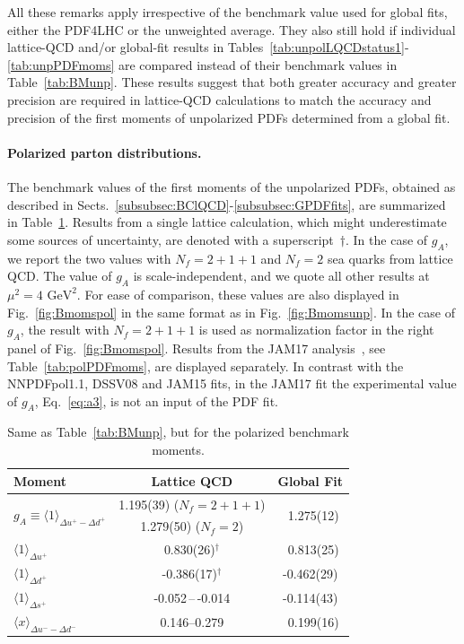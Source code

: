 All these remarks apply irrespective of the benchmark value used for 
global fits, either the PDF4LHC or the unweighted average.
%
They also still hold if individual lattice-QCD and/or global-fit
results in Tables~\ref{tab:unpolLQCDstatus1}-\ref{tab:unpPDFmoms} are 
compared instead of their benchmark values in Table~\ref{tab:BMunp}. 
%
These results suggest that both greater accuracy and greater precision are
required in lattice-QCD calculations to match the accuracy and 
precision of the first moments of unpolarized PDFs determined from a global
fit.

\paragraph{Polarized parton distributions.}
%
The benchmark values of the first moments of the unpolarized PDFs, obtained
as described in Sects.~\ref{subsubsec:BClQCD}-\ref{subsubsec:GPDFfits}, 
are summarized in Table~\ref{tab:BMpol}.
%
Results from a single lattice calculation, which might underestimate some 
sources of uncertainty, are denoted with a superscript~$\dagger$.
%
In the case of $g_A$, we report the two values with $N_f=2+1+1$ and
$N_f=2$ sea quarks from lattice QCD.
%
The value of $g_A$ is scale-independent, and we quote all other results at 
$\mu^2=4\mbox{ GeV}^2$.
%
For ease of comparison, these values are also displayed in 
Fig.~\ref{fig:Bmomspol} in the same format as in Fig.~\ref{fig:Bmomsunp}.
%
In the case of $g_A$, the result with $N_f=2+1+1$ is used as normalization
factor in the right panel of Fig.~\ref{fig:Bmomspol}.
%
Results from the JAM17 analysis~\cite{Ethier:2017zbq}, see 
Table~\ref{tab:polPDFmoms}, are displayed separately.
%
In contrast with the NNPDFpol1.1, DSSV08 and JAM15 fits, in the JAM17 fit 
the experimental value of $g_A$, Eq.~\eqref{eq:a3}, 
is not an input of the PDF fit.

\begin{table}[!t]
\centering
\renewcommand{\arraystretch}{1.2}
\begin{tabular}{lcc}
\toprule
Moment & Lattice QCD & Global Fit\\
\midrule
\multirow{2}{*}{$g_A\equiv\langle 1\rangle_{\Delta u^+ - \Delta d^+}$} 
& 1.195(39) ($N_f=2+1+1$) 
& \multirow{2}{*}{\ 1.275(12)} \\
& 1.279(50) ($N_f=2$) & \\
$\langle 1 \rangle_{\Delta u^+}$     
& 0.830(26)$^\dagger$ 
& \ 0.813(25)\\
$\langle 1 \rangle_{\Delta d^+}$     
& -0.386(17)$^\dagger$ 
& -0.462(29)\\
$\langle 1 \rangle_{\Delta s^+}$     
& -0.052\,--\,-0.014
& -0.114(43)\\
$\langle x\rangle_{\Delta u^- - \Delta d^-}$       
& \numrange{0.146}{0.279} 
& \ 0.199(16)\\
\bottomrule
\end{tabular}
\caption{\small Same as Table~\ref{tab:BMunp}, but for the polarized benchmark 
moments.}
\label{tab:BMpol}
\end{table}

